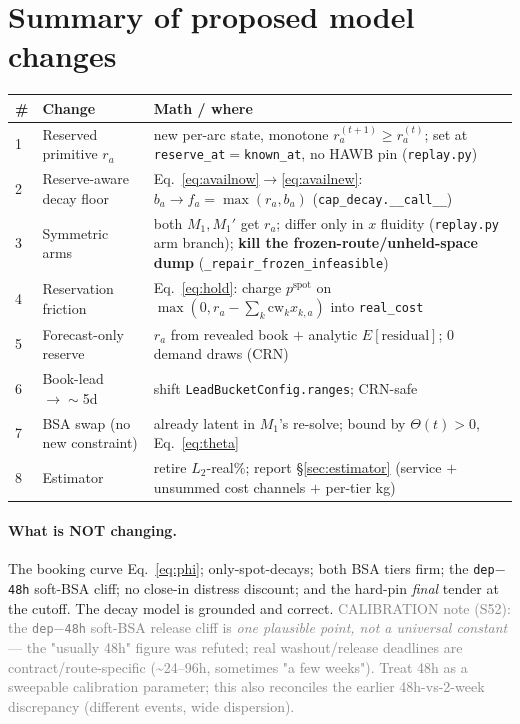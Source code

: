 \documentclass[11pt]{article}
\newcommand{\cw}{\mathrm{cw}}
\newcommand{\resv}{r}
\newcommand{\code}[1]{\texttt{#1}}
\newcommand{\note}[1]{\textcolor{gray}{\small #1}}
\begin{document}
\section{Summary of proposed model changes}\label{sec:changes}
\begin{center}
\renewcommand{\arraystretch}{1.2}
\begin{tabular}{@{}p{0.5cm}p{5.3cm}p{8.3cm}@{}}
\toprule
\# & Change & Math / where \\
\midrule
1 & Reserved primitive $\resv_a$ & new per-arc state, monotone $\resv_a^{(t+1)}\ge\resv_a^{(t)}$; set at \code{reserve\_at}$=$\code{known\_at}, no HAWB pin (\code{replay.py}) \\
2 & Reserve-aware decay floor & Eq.~\eqref{eq:availnow}$\to$\eqref{eq:availnew}: $b_a\!\to\!f_a\!=\!\max(\resv_a,b_a)$ (\code{cap\_decay.\_\_call\_\_}) \\
3 & Symmetric arms & both $M_1,M_1'$ get $\resv_a$; differ only in $x$ fluidity (\code{replay.py} arm branch); \textbf{kill the frozen-route/unheld-space dump} (\code{\_repair\_frozen\_infeasible}) \\
4 & Reservation friction & Eq.~\eqref{eq:hold}: charge $p^{\mathrm{spot}}$ on $\max(0,\resv_a-\sum_k\cw_k x_{k,a})$ into \code{real\_cost} \\
5 & Forecast-only reserve & $\resv_a$ from revealed book $+$ analytic $E[\text{residual}]$; 0 demand draws (CRN) \\
6 & Book-lead $\to\sim$5d & shift \code{LeadBucketConfig.ranges}; CRN-safe \\
7 & BSA swap (no new constraint) & already latent in $M_1$'s re-solve; bound by $\Theta(t)>0$, Eq.~\eqref{eq:theta} \\
8 & Estimator & retire $L_2$-real\%; report \S\ref{sec:estimator} (service $+$ unsummed cost channels $+$ per-tier kg) \\
\bottomrule
\end{tabular}
\end{center}

\paragraph{What is NOT changing.} The booking curve Eq.~\eqref{eq:phi}; only-spot-decays; both BSA tiers
firm; the \code{dep$-$48h} soft-BSA cliff; no close-in distress discount; and the hard-pin \emph{final}
tender at the cutoff. The decay model is grounded and correct.
\note{CALIBRATION note (S52): the \code{dep$-$48h} soft-BSA release cliff is \emph{one plausible point,
not a universal constant} --- the "usually 48h" figure was refuted; real washout/release deadlines are
contract/route-specific (\textasciitilde24--96h, sometimes "a few weeks"). Treat 48h as a sweepable
calibration parameter; this also reconciles the earlier 48h-vs-2-week discrepancy (different events, wide
dispersion).}
\end{document}
